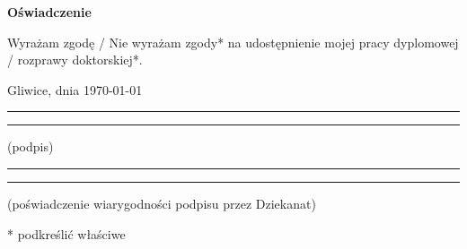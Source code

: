 \documentclass[a4paper,twoside,12pt]{book}
\newcommand{\tytul}{Predykcja zachowań zawodników podczas meczu piłki siatkowej}
\begin{document}
\vfill  

\begin{center}
\Large\bfseries Oświadczenie
\end{center}

\vfill

Wyrażam  zgodę / Nie wyrażam zgody*  na  udostępnienie  mojej  pracy  dyplomowej / rozprawy doktorskiej*.

\vfill

Gliwice, dnia \today

\vfill

\rule{0.5\textwidth}{0cm}\dotfill 

\rule{0.5\textwidth}{0cm}
\begin{minipage}{0.45\textwidth}
{\begin{center}(podpis)\end{center}}
\end{minipage} 

\vfill

\rule{0.5\textwidth}{0cm}\dotfill 

\rule{0.5\textwidth}{0cm}
\begin{minipage}{0.45\textwidth}
{\begin{center}\rule{0mm}{5mm}(poświadczenie wiarygodności podpisu przez Dziekanat)\end{center}}
\end{minipage}


\vfill

* podkreślić właściwe

 


%
%
%
%
%
%
%
%
%
%
%
%
%
%
\end{document}
